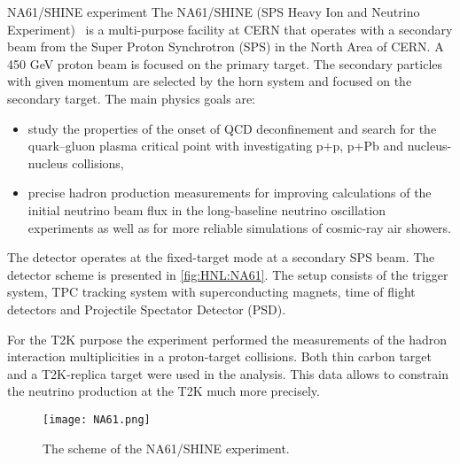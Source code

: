 \documentclass[../main.tex]{subfiles}
\begin{document}
\begin{bclogo}[couleur=blue!2, arrondi=0.1, logo=\bcinfo, nobreak=true]{NA61/SHINE experiment}
The NA61/SHINE (SPS Heavy Ion and Neutrino Experiment)~\cite{Abgrall2014} is a multi-purpose facility at CERN that operates with a secondary beam from the Super Proton Synchrotron (SPS) in the North Area of CERN. A 450 GeV proton beam is focused on the primary target. The secondary particles with given momentum are selected by the horn system and focused on the secondary target. The main physics goals are:
\begin{itemize}
    \item study the properties of the onset of QCD deconfinement and search for the quark--gluon plasma critical point with investigating p+p, p+Pb and nucleus-nucleus collisions,
    \item precise hadron production measurements for improving calculations of the initial neutrino beam flux in the long-baseline neutrino oscillation experiments as well as for more reliable simulations of cosmic-ray air showers.
\end{itemize}

The detector operates at the fixed-target mode at a secondary SPS beam. The detector scheme is presented in \autoref{fig:HNL:NA61}. The setup consists of the trigger system, TPC tracking system with superconducting magnets, time of flight detectors and Projectile Spectator Detector (PSD).

For the T2K purpose the experiment performed the measurements of the hadron interaction multiplicities in a proton-target collisions. Both thin carbon target and a T2K-replica target were used in the analysis. This data allows to constrain the neutrino production at the T2K much more precisely.
\end{bclogo}

\begin{figure}[!ht]
    \centering
    \texttt{[image: NA61.png]}
    \caption{The scheme of the NA61/SHINE experiment.}
    \label{fig:HNL:NA61}
\end{figure}
\end{document}
